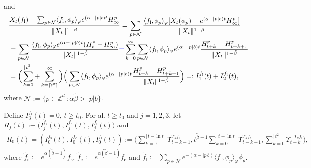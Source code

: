 \documentclass[12pt,a4paper]{amsart}
\theoremstyle{plain}
\theoremstyle{definition}
\numberwithin{equation}{section}
\begin{document}
and
 \begin{align}
    & \frac{X_t(f_\mathrm l) - \sum_{p\in \mathcal N} \langle f_\mathrm l,\phi_p\rangle_\varphi e^{(\alpha - |p|b)t}H_\infty^p}{\|X_t\|^{1- \tilde \beta}}
      = \sum_{p\in \mathcal N}\frac{ \langle f_\mathrm l,\phi_p\rangle_\varphi [X_t(\phi_p) - e^{(\alpha - |p|b)t}H_\infty^p]}{\|X_t\|^{1- \tilde \beta}}
    \\& = \sum_{p \in \mathcal N} \frac{\langle f_\mathrm l,\phi_p\rangle_\varphi e^{(\alpha - |p|b)t}(H_t^p - H_\infty^p)}{\|X_t\|^{1- \tilde \beta}}
    {\color{blue}=} \sum_{k=0}^\infty \sum_{p \in \mathcal N}  \langle f_\mathrm l,\phi_p\rangle_\varphi e^{(\alpha - |p|b)t}\frac{ H_{t+k}^p - H_{t+k+1}^p}{\|X_t\|^{1- \tilde \beta}}
    \\ &= \Big(\sum_{k = 0}^{\lfloor t^2 \rfloor}  +\sum_{k = \lceil t^2 \rceil}^\infty \Big)\Big(\sum_{p \in \mathcal N}  \langle f_\mathrm l,\phi_p\rangle_\varphi e^{(\alpha - |p|b)t}\frac{ H_{t+k}^p - H_{t+k+1}^p}{\|X_t\|^{1- \tilde \beta}}\Big)
         = : I^{f_\mathrm l}_1(t) + I^{f_\mathrm l}_2(t),
  \end{align}
where $\mathcal N:= \{p\in \mathbb Z_+^d: \alpha \tilde \beta > |p|b\}$.

Define $I_3^{f_\mathrm l}(t)=0$, $t\geq t_0$. For all $t\geq t_0$ and $j=1,2,3$, let
\(
   R_j(t):=\big(I_j^{f_\mathrm s}(t),I_j^{f_\mathrm c}(t),I_j^{f_\mathrm l}(t)\big)
\)
and
\begin{align}
    R_0(t)=(I_0^{f_\mathrm s}(t),I_0^{f_\mathrm c}(t),I_0^{f_\mathrm l}(t))
    :=\Big(\sum_{k=0}^{\lfloor t-\ln t \rfloor} \Upsilon_{t-k-1}^{T_k \tilde f_\mathrm s},t^{\tilde \beta - 1}\sum_{k=0}^{\lfloor t-\ln t \rfloor} \Upsilon_{t-k-1}^{T_{k} \tilde f_\mathrm c},\sum_{k = 0}^{\lfloor t^2 \rfloor} \Upsilon_{t+k}^{- T_k \tilde f_\mathrm l}\Big),
\end{align}
where $\tilde f_\mathrm s:=e^{\alpha(\tilde \beta - 1)} f_\mathrm s$, $\tilde f_\mathrm c:=e^{\alpha(\tilde \beta - 1)} f_\mathrm c$ and  $\tilde f_\mathrm l := \sum_{p\in \mathcal N} e^{-(\alpha - |p|b)}\langle f_\mathrm l, \phi_p \rangle_\varphi \phi_p$.
\end{document}
